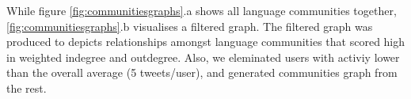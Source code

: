 \documentclass{llncs}
\begin{document}
While figure \ref{fig:communitiesgraphs}.a shows all language communities together, 
\ref{fig:communitiesgraphs}.b visualises a filtered graph. The filtered graph was 
produced to depicts relationships amongst language communities that scored 
high in weighted indegree and outdegree. Also, we eleminated users with activiy 
lower than the overall average (5 tweets/user), and generated communities graph 
from the rest.







\end{document}
